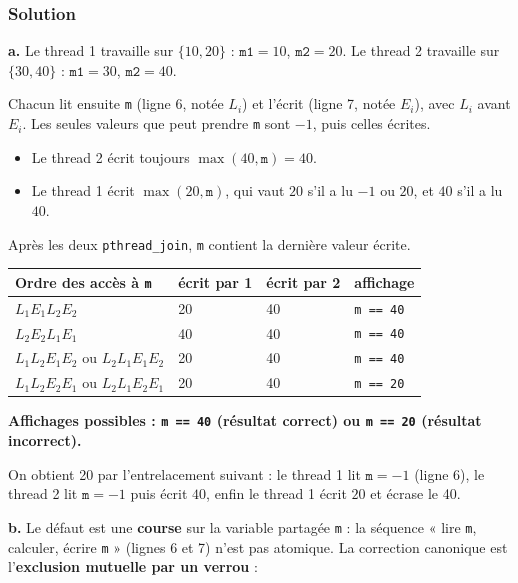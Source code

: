 \documentclass[11pt,a4paper]{article}
\providecommand{\tightlist}{\setlength{\itemsep}{0pt}\setlength{\parskip}{0pt}}
\begin{document}
\hypertarget{solution-12}{%
\subsubsection{Solution}\label{solution-12}}

\textbf{a.} Le thread 1 travaille sur \(\{10,20\}\) : \(\texttt{m1}=10\), \(\texttt{m2}=20\). Le thread 2 travaille sur \(\{30,40\}\) : \(\texttt{m1}=30\), \(\texttt{m2}=40\).

Chacun lit ensuite \texttt{m} (ligne 6, notée \(L_i\)) et l'écrit (ligne 7, notée \(E_i\)), avec \(L_i\) avant \(E_i\). Les seules valeurs que peut prendre \texttt{m} sont \(-1\), puis celles écrites.

\begin{itemize}
\tightlist
\item
  Le thread 2 écrit toujours \(\max(40,\texttt m)=40\).
\item
  Le thread 1 écrit \(\max(20,\texttt m)\), qui vaut \(20\) s'il a lu \(-1\) ou \(20\), et \(40\) s'il a lu \(40\).
\end{itemize}

Après les deux \texttt{pthread\_join}, \texttt{m} contient la dernière valeur écrite.

\begin{longtable}[]{@{}llll@{}}
\toprule\noalign{}
Ordre des accès à \texttt{m} & écrit par 1 & écrit par 2 & affichage \\
\midrule\noalign{}
\endhead
\bottomrule\noalign{}
\endlastfoot
\(L_1E_1L_2E_2\) & 20 & 40 & \texttt{m\ ==\ 40} \\
\(L_2E_2L_1E_1\) & 40 & 40 & \texttt{m\ ==\ 40} \\
\(L_1L_2E_1E_2\) ou \(L_2L_1E_1E_2\) & 20 & 40 & \texttt{m\ ==\ 40} \\
\(L_1L_2E_2E_1\) ou \(L_2L_1E_2E_1\) & 20 & 40 & \texttt{m\ ==\ 20} \\
\end{longtable}

\textbf{Affichages possibles : \texttt{m\ ==\ 40} (résultat correct) ou \texttt{m\ ==\ 20} (résultat incorrect).}

On obtient 20 par l'entrelacement suivant : le thread 1 lit \(\texttt m=-1\) (ligne 6), le thread 2 lit \(\texttt m=-1\) puis écrit \(40\), enfin le thread 1 écrit \(20\) et écrase le 40.

\textbf{b.} Le défaut est une \textbf{course} sur la variable partagée \texttt{m} : la séquence « lire \texttt{m}, calculer, écrire \texttt{m} » (lignes 6 et 7) n'est pas atomique. La correction canonique est l'\textbf{exclusion mutuelle par un verrou} :
\end{document}
